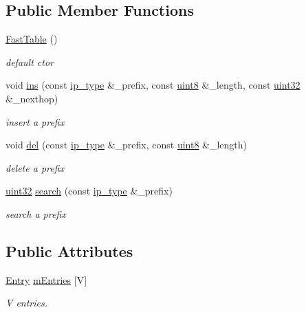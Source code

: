 \subsection*{Public Member Functions}
\begin{DoxyCompactItemize}
\item 
\hyperlink{structFastTable_a10383971aad3975696c61f0780f69efd}{Fast\-Table} ()
\begin{DoxyCompactList}\small\item\em default ctor \end{DoxyCompactList}\item 
void \hyperlink{structFastTable_ab9d928e0b9527765ba0bcea283517ae6}{ins} (const \hyperlink{structFastTable_ab9dad4b2ee8234f75a7bb5da2331b6e5}{ip\-\_\-type} \&\-\_\-prefix, const \hyperlink{types_8h_a34ecedcf03a70dc91e4616212d79267d}{uint8} \&\-\_\-length, const \hyperlink{types_8h_abd01e8e67e3d94cab04ecaaf4f85ac1b}{uint32} \&\-\_\-nexthop)
\begin{DoxyCompactList}\small\item\em insert a prefix \end{DoxyCompactList}\item 
void \hyperlink{structFastTable_a7c581dc2325ef31797fd302f51163d38}{del} (const \hyperlink{structFastTable_ab9dad4b2ee8234f75a7bb5da2331b6e5}{ip\-\_\-type} \&\-\_\-prefix, const \hyperlink{types_8h_a34ecedcf03a70dc91e4616212d79267d}{uint8} \&\-\_\-length)
\begin{DoxyCompactList}\small\item\em delete a prefix \end{DoxyCompactList}\item 
\hyperlink{types_8h_abd01e8e67e3d94cab04ecaaf4f85ac1b}{uint32} \hyperlink{structFastTable_ae63321e3ae1875e9c6b8908f4cea3fe3}{search} (const \hyperlink{structFastTable_ab9dad4b2ee8234f75a7bb5da2331b6e5}{ip\-\_\-type} \&\-\_\-prefix)
\begin{DoxyCompactList}\small\item\em search a prefix \end{DoxyCompactList}\end{DoxyCompactItemize}
\subsection*{Public Attributes}
\begin{DoxyCompactItemize}
\item 
\hyperlink{structFastTable_1_1Entry}{Entry} \hyperlink{structFastTable_acf2546d8e79d9eaced3d19a1dc842fb9}{m\-Entries} \mbox{[}V\mbox{]}
\begin{DoxyCompactList}\small\item\em V entries. \end{DoxyCompactList}\end{DoxyCompactItemize}
